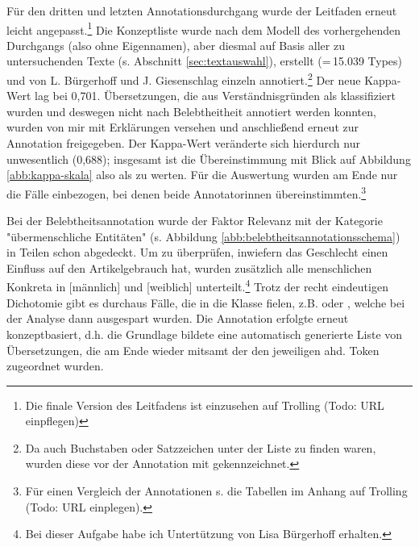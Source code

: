 Für den dritten und letzten Annotationsdurchgang wurde der Leitfaden erneut leicht angepasst.\footnote{Die finale Version des Leitfadens ist einzusehen auf Trolling (Todo: URL einpflegen)} Die Konzeptliste wurde nach dem Modell des vorhergehenden Durchgangs (also ohne Eigennamen), aber diesmal auf Basis aller zu untersuchenden Texte (s. Abschnitt \ref{sec:textauswahl}), erstellt (=\,15.039 Types) und von L. Bürgerhoff und J. Giesenschlag einzeln annotiert.\footnote{Da auch Buchstaben oder Satzzeichen unter der Liste zu finden waren, wurden diese vor der Annotation mit  gekennzeichnet.} Der neue Kappa-Wert lag bei 0,701. Übersetzungen, die aus Verständnisgründen als  klassifiziert wurden und deswegen nicht nach Belebtheitheit annotiert werden konnten, wurden von mir mit Erklärungen versehen und anschließend erneut zur Annotation freigegeben. Der Kappa-Wert veränderte sich hierdurch nur unwesentlich (0,688); insgesamt ist die Übereinstimmung mit Blick auf Abbildung \ref{abb:kappa-skala} also als   zu werten. Für die Auswertung wurden am Ende nur die Fälle einbezogen, bei denen beide Annotatorinnen übereinstimmten.\footnote{Für einen Vergleich der Annotationen s. die Tabellen im Anhang auf Trolling (Todo: URL einplegen).} 


Bei der Belebtheitsannotation wurde der Faktor Relevanz mit der Kategorie "übermenschliche Entitäten" (s. Abbildung \ref{abb:belebtheitsannotationsschema}) in Teilen schon abgedeckt. Um zu überprüfen, inwiefern das Geschlecht einen Einfluss auf den Artikelgebrauch hat, wurden zusätzlich alle menschlichen Konkreta in [männlich] und [weiblich] unterteilt.\footnote{Bei dieser Aufgabe habe ich Untertützung von Lisa Bürgerhoff erhalten.} 
Trotz der recht eindeutigen Dichotomie gibt es durchaus Fälle, die in die Klasse  fielen, z.B.  oder , welche bei der Analyse dann ausgespart wurden.  Die Annotation erfolgte erneut konzeptbasiert, d.h. die Grundlage bildete eine automatisch generierte Liste von Übersetzungen, die am Ende wieder mitsamt der  den jeweiligen ahd. Token zugeordnet wurden. 


